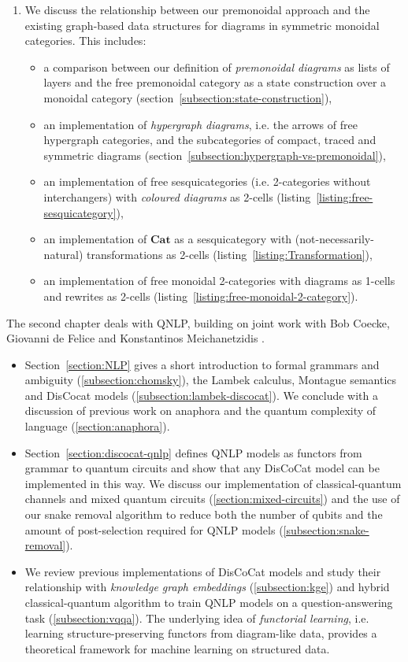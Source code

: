 \begin{enumerate}
\item We discuss the relationship between our premonoidal approach and the existing graph-based data structures for diagrams in symmetric monoidal categories.
This includes:
\begin{itemize}
\item a comparison between our definition of \emph{premonoidal diagrams} as lists of layers and the free premonoidal category as a state construction over a monoidal category (section~\ref{subsection:state-construction}),
\item an implementation of \emph{hypergraph diagrams}, i.e. the arrows of free hypergraph categories, and the subcategories of compact, traced and symmetric diagrams (section~\ref{subsection:hypergraph-vs-premonoidal}),
\item an implementation of free sesquicategories (i.e. 2-categories without interchangers) with \emph{coloured diagrams} as 2-cells (listing~\ref{listing:free-sesquicategory}),
\item an implementation of $\mathbf{Cat}$ as a sesquicategory with (not-necessarily-natural) transformations as 2-cells (listing~\ref{listing:Transformation}),
\item an implementation of free monoidal 2-categories with diagrams as 1-cells and rewrites as 2-cells (listing~\ref{listing:free-monoidal-2-category}).
\end{itemize}
\end{enumerate}
The second chapter deals with QNLP, building on joint work with Bob Coecke, Giovanni de Felice and Konstantinos Meichanetzidis \cite{MeichanetzidisEtAl20,CoeckeEtAl20,MeichanetzidisEtAl20a}.
\begin{itemize}
\item Section~\ref{section:NLP} gives a short introduction to formal grammars and ambiguity (\ref{subsection:chomsky}), the Lambek calculus, Montague semantics and DisCocat models (\ref{subsection:lambek-discocat}).
We conclude with a discussion of previous work on anaphora and the quantum complexity of language (\ref{section:anaphora}).
\item Section~\ref{section:discocat-qnlp} defines QNLP models as functors from grammar to quantum circuits and show that any DisCoCat model can be implemented in this way.
We discuss our implementation of classical-quantum channels and mixed quantum circuits (\ref{section:mixed-circuits}) and the use of our snake removal algorithm to reduce both the number of qubits and the amount of post-selection required for QNLP models (\ref{subsection:snake-removal}).
\item We review previous implementations of DisCoCat models and study their relationship with \emph{knowledge graph embeddings} (\ref{subsection:kge}) and  hybrid classical-quantum algorithm to train QNLP models on a question-answering task (\ref{subsection:vqqa}).
The underlying idea of \emph{functorial learning}, i.e. learning structure-preserving functors from diagram-like data, provides a theoretical framework for machine learning on structured data.
\end{itemize}
